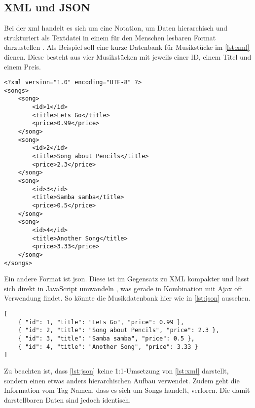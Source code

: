 \subsection{XML und JSON}
Bei der \ac{xml} handelt es sich um eine Notation, um Daten hierarchisch und strukturiert als Textdatei in einem für den Menschen lesbaren Format darzustellen \cite[S. 34]{seb10}. Als Beispiel soll eine kurze Datenbank für Musikstücke im \autoref{lst:xml} dienen. Diese besteht aus vier Musikstücken mit jeweils einer ID, einem Titel und einem Preis.
\begin{lstlisting}[style=xml, caption=Ein XML-Beispiel, label=lst:xml]
<?xml version="1.0" encoding="UTF-8" ?>
<songs>
	<song>
		<id>1</id>
		<title>Lets Go</title>
		<price>0.99</price>
	</song>
	<song>
		<id>2</id>
		<title>Song about Pencils</title>
		<price>2.3</price>
	</song>
	<song>
		<id>3</id>
		<title>Samba samba</title>
		<price>0.5</price>
	</song>
	<song>
		<id>4</id>
		<title>Another Song</title>
		<price>3.33</price>
	</song>
</songs>
\end{lstlisting}

Ein andere Format ist \ac{json}. Diese ist im Gegensatz zu XML kompakter und lässt sich direkt in JavaScript umwandeln \cite[S. 658]{rie09}, was gerade in Kombination mit Ajax oft Verwendung findet. So könnte die Musikdatenbank hier wie in \autoref{lst:json} aussehen.

\begin{lstlisting}[style=htmlcssjs, caption=JSON für eine einfache Musikdatenbank, label=lst:json]
[
	{ "id": 1, "title": "Lets Go", "price": 0.99 },
	{ "id": 2, "title": "Song about Pencils", "price": 2.3 },
	{ "id": 3, "title": "Samba samba", "price": 0.5 },
	{ "id": 4, "title": "Another Song", "price": 3.33 }
]
\end{lstlisting}

Zu beachten ist, dass \autoref{lst:json} keine 1:1-Umsetzung von \autoref{lst:xml} darstellt, sondern einen etwas anders hierarchischen Aufbau verwendet. Zudem geht die Information vom Tag-Namen, dass es sich um Songs handelt, verloren. Die damit darstellbaren Daten sind jedoch identisch.